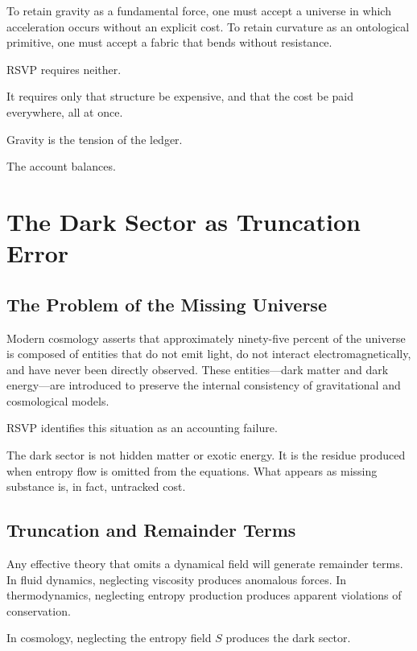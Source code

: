 \documentclass[11pt]{book}
\begin{document}
To retain gravity as a fundamental force, one must accept a universe in which acceleration occurs without an explicit cost. To retain curvature as an ontological primitive, one must accept a fabric that bends without resistance.

RSVP requires neither.

It requires only that structure be expensive, and that the cost be paid everywhere, all at once.

Gravity is the tension of the ledger.

The account balances.


\chapter{The Dark Sector as Truncation Error}

\section{The Problem of the Missing Universe}

Modern cosmology asserts that approximately ninety-five percent of the universe is composed of entities that do not emit light, do not interact electromagnetically, and have never been directly observed. These entities---dark matter and dark energy---are introduced to preserve the internal consistency of gravitational and cosmological models.

RSVP identifies this situation as an accounting failure.

The dark sector is not hidden matter or exotic energy. It is the residue produced when entropy flow is omitted from the equations. What appears as missing substance is, in fact, untracked cost.

\section{Truncation and Remainder Terms}

Any effective theory that omits a dynamical field will generate remainder terms. In fluid dynamics, neglecting viscosity produces anomalous forces. In thermodynamics, neglecting entropy production produces apparent violations of conservation.

In cosmology, neglecting the entropy field \(S\) produces the dark sector.
\end{document}
